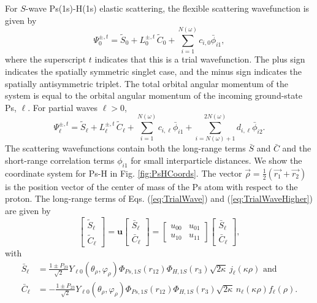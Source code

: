 \documentclass[preprint,showpacs,showkeys,preprintnumbers,amsmath,amssymb,longbibliography,pra,aps]{revtex4-1}
\begin{document}
For $S$-wave Ps(1s)-H(1s) elastic scattering, the flexible scattering
wavefunction is given by
\begin{equation}
\Psi_0^{\pm,t} = \widetilde{S}_0 + L_0^{\pm,t} \, \widetilde{C}_0
  + \sum_{i=1}^{N(\omega)} c_{i,0} \bar{\phi}_{i1},
\label{eq:TrialWave}
\end{equation}
where the superscript $t$ indicates that this is a trial wavefunction. The plus
sign indicates the spatially symmetric singlet case, and the minus sign
indicates the spatially antisymmetric triplet. The total orbital angular
momentum of the system is equal to the orbital angular momentum of the incoming
ground-state Ps, $\ell$. For partial waves $\ell > 0$,
\begin{equation}
\Psi_\ell^{\pm,t} = \widetilde{S}_\ell + L^{\pm,t}_\ell \, \widetilde{C}_\ell
 + \sum_{i=1}^{N(\omega)} c_{i,\ell} \bar{\phi}_{i1}
 + \!\!\!\sum_{i=N(\omega)+1}^{2N(\omega)} \!\! d_{i,\ell} \bar{\phi}_{i2}.
\label{eq:TrialWaveHigher}
\end{equation}
The scattering wavefunctions contain both the long-range terms $\bar{S}$ and
$\bar{C}$ and the short-range correlation terms $\phi_{i1}$ for small
interparticle distances. We show the coordinate system for Ps-H in 
Fig. \ref{fig:PsHCoords}. The vector
$\vec{\rho} = \frac{1}{2}\left(\vec{r_1} + \vec{r_2}\right)$ is the position
vector of the center of mass of the Ps atom with respect to the proton. The 
long-range terms of Eqs. (\ref{eq:TrialWave}) and (\ref{eq:TrialWaveHigher})
are given by
\begin{equation}
\label{eq:SCPhiDef}
\begin{bmatrix}
\widetilde{S}_\ell \\ \widetilde{C}_\ell
\end{bmatrix} = \textbf{u}  \begin{bmatrix}
\bar{S}_\ell \\ \bar{C}_\ell
\end{bmatrix} = \begin{bmatrix}
u_{00} & u_{01} \\  u_{10} & u_{11}
\end{bmatrix}
\begin{bmatrix}
\bar{S}_\ell \\ \bar{C}_\ell
\end{bmatrix}, 
\end{equation}
with
\begin{subequations}
\label{eq:SCBarPhiDef}
\begin{align}
\bar{S}_\ell &= \frac{1\pm P_{23}}{\sqrt{2}}Y_{\ell 0}(\theta_\rho,
  \varphi_\rho)\Phi_{Ps,1S}\left(r_{12}\right) \Phi_{H,1S}\left(r_3\right)
  \sqrt{2\kappa} \,j_\ell\left(\kappa\rho\right) \text{ and} \label{eq:SBar} \\
\bar{C}_\ell &= -\frac{1\pm P_{23}}{\sqrt{2}}Y_{\ell 0}(\theta_\rho,
  \varphi_\rho)\Phi_{Ps,1S}\left(r_{12}\right) \Phi_{H,1S}\left(r_3\right)
  \sqrt{2\kappa} \,n_\ell\left(\kappa\rho\right) f_\ell(\rho). \label{eq:CBar}
\end{align}
\end{subequations}
\end{document}
